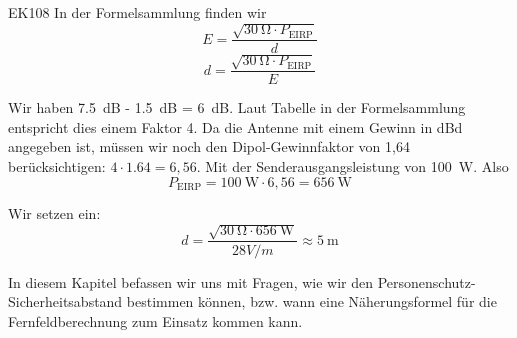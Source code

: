 \begin{sol}{EK108}
    In der Formelsammlung finden wir 
    $$ E = \frac{\sqrt{\SI{30}{\ohm}\cdot P_{\text{EIRP}}}}{d}$$
    $$ d = \frac{\sqrt{\SI{30}{\ohm}\cdot P_{\text{EIRP}}}}{E}$$

    Wir haben \SI{7,5}{\dB} - \SI{1,5}{\dB} = \SI{6}{\dB}. Laut Tabelle in der Formelsammlung entspricht dies einem Faktor 4. Da die Antenne mit einem Gewinn in dBd angegeben ist, müssen wir noch den Dipol-Gewinnfaktor von 1,64 berücksichtigen: $4\cdot 1.64 = 6,56$.
    Mit der Senderausgangsleistung von \SI{100}{\watt}. Also $$P_{\text{EIRP}} = \SI{100}{\watt} \cdot 6,56 = \SI{656}{\watt}$$

    Wir setzen ein:
     $$ d = \frac{\sqrt{\SI{30}{\ohm}\cdot \SI{656}{\watt}}}{28 V/m} \approx \SI{5}{\meter}$$     

\end{sol}


\begin{ohmchapter}
 In diesem Kapitel befassen wir uns mit Fragen, wie wir den Personenschutz-Sicherheitsabstand bestimmen können, bzw. wann eine Näherungsformel für die Fernfeldberechnung zum Einsatz kommen kann.
\end{ohmchapter}
